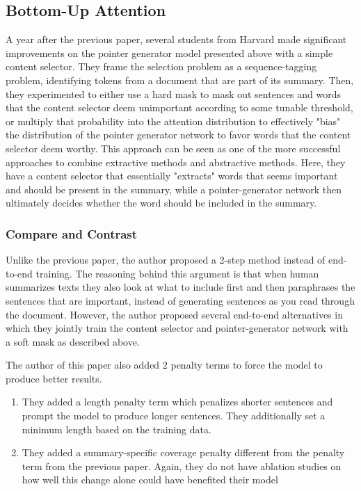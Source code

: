 \documentclass[11pt,a4paper]{article}
\begin{document}
\subsection{Bottom-Up Attention}
A year after the previous paper, several students from Harvard \cite{bottom-up} made significant improvements on the pointer generator model presented above with a simple content selector. They frame the selection problem as a sequence-tagging problem, identifying tokens from a document that are part of its summary. Then, they experimented to either use a hard mask to mask out sentences and words that the content selector deem unimportant according to some tunable threshold, or multiply that probability into the attention distribution to effectively "bias" the distribution of the pointer generator network to favor words that the content selector deem worthy. This approach can be seen as one of the more successful approaches to combine extractive methods and abstractive methods. Here, they have a content selector that essentially "extracts" words that seems important and should be present in the summary, while a pointer-generator network then ultimately decides whether the word should be included in the summary. 

\subsubsection{Compare and Contrast}

Unlike the previous paper, the author proposed a 2-step method instead of end-to-end training. The reasoning behind this argument is that when human summarizes texts they also look at what to include first and then paraphrases the sentences that are important, instead of generating sentences as you read through the document. However, the author proposed several end-to-end alternatives in which they jointly train the content selector and pointer-generator network with a soft mask as described above. 

The author of this paper also added 2 penalty terms to force the model to produce better results.
\begin{enumerate}
	\item They added a length penalty term which penalizes shorter sentences and prompt the model to produce longer sentences. They additionally set a minimum length based on the training data.
	\item They added a summary-specific coverage penalty different from the penalty term from the previous paper. Again, they do not have ablation studies on how well this change alone could have benefited their model
\end{enumerate}
\end{document}
